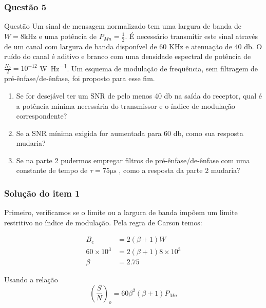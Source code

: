 \documentclass[aspectratio=169,dvipsnames]{beamer}
\begin{document}
\begin{frame}
  \frametitle{Questão 5}
\scriptsize
  \begin{block}{Questão}
    Um sinal de mensagem normalizado tem uma largura de banda de $W = 8 \si{\kilo \hertz}$
     e uma potência de $P_{Mn} = \frac{1}{2}$. É necessário transmitir este sinal 
     através de um canal com largura de banda disponível de 60 KHz e atenuação de 40 \si{\decibel}.
     O ruído do canal é aditivo e branco com uma densidade espectral de potência de 
     $\frac{N_0}{2} = 10^{-12}$ \si{\watt \per \hertz}. Um esquema de modulação de frequência, 
     sem filtragem de pré-ênfase/de-ênfase, foi proposto para esse fim.

     \begin{enumerate}
      \item Se for desejável ter um SNR de pelo menos 40 \si{\decibel} na saída do receptor, qual é a potência mínima necessária do transmissor e o índice de modulação correspondente?
      \item Se a SNR mínima exigida for aumentada para 60 \si{\decibel}, como sua resposta mudaria?
      \item Se na parte 2 pudermos empregar filtros de pré-ênfase/de-ênfase com uma constante de tempo de $\tau = 75 \si{\micro \second} $ , como a resposta da parte 2 mudaria?
    \end{enumerate}
    
  \end{block}

\end{frame}




\begin{frame}
  \frametitle{Solução do item 1}
  Primeiro, verificamos se o limite ou a largura de banda impõem um limite restritivo no índice de modulação. Pela regra de Carson temos:

\begin{align*}
B_c &= 2(\beta+1)W \\
60 \times 10^3 &= 2(\beta+1) 8 \times 10^3 \\
\beta &= 2.75
\end{align*}

Usando a relação $$\left(\frac{S}{N}\right)_o = 60 \beta^2(\beta+1)P_{Mn}$$


\end{frame}
\end{document}
